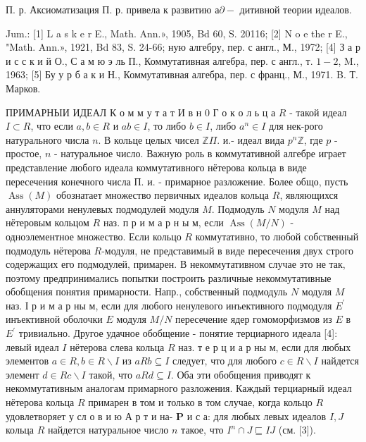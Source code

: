 \documentclass[10pt]{article}
\begin{document}
П. р. Аксиоматизация П. р. привела к развитию $а \partial-$ дитивной теории идеалов.



Jum.: [1] L a s k e r E., Math. Ann.», 1905, Bd 60, S. 20116; [2] N o e the r E., "Math. Ann.», 1921, Bd 83, S. 24-66; ную алгебру, пер. с англ., М., 1972; [4] З а р и с с к и й О., С а м ю э ль П., Коммутативная алгебра, пер. с англ., т. $1-2$, M., 1963; [5] Бу у р б а к и Н., Коммутативная алгебра, пер. с франц., М., 1971. B. Т. Марков.



ПРИМАРНЫИ ИДЕАЛ К о м м у т а т И в н 0 Г $о$ к о л ь ц а $R$ - такой идеал $I \subset R$, что если $a, b \in R$ и $a b \in I$, то либо $b \in I$, либо $a^{n} \in I$ для нек-рого натурального числа $n$. В кольце целых чисел $\mathbb{Z} \Pi$. и.- идеал вида $p^{n} \mathbb{Z}$, где $p$ - простое, $n$ - натуральное число. Важную роль в коммутативной алгебре играет представление любого идеала коммутативного нётерова кольца в виде пересечения конечного числа П. и. - примарное разложение. Более общо, пусть $\operatorname{Ass}(M)$ обознатает множество первичных идеалов кольца $R$, являющихся аннуляторами ненулевых подмодулей модуля $M$. Подмодуль $N$ модуля $M$ над нётеровым кольцом $R$ наз. п р и м а р н ы м, если $\operatorname{Ass}(M / N)$ - одноэлементное множество. Если кольцо $R$ коммутативно, то любой собственный подмодуль нётерова $R$-модуля, не представимый в виде пересечения двух строго содержащих его подмодулей, примарен. В некоммутативном случае это не так, поэтому предпринимались попытки построить различные некоммутативные обобщения понятия примарности. Напр., собственный подмодуль $N$ модуля $M$ наз. І р и м а р ны м, если для любого ненулевого инъективного подмодуля $E^{\prime}$ инъективной оболочки $E$ модуля $M / N$ пересечение ядер гомоморфизмов из $E$ в $E^{\prime}$ тривиально. Другое удачное обобщение - понятие терциарного идеала [4]: левый идеал $I$ нётерова слева кольца $R$ наз. т е р ц и а р ны м, если для любых элементов $a \in R, b \in R \backslash I$ из $a R b \subseteq I$ следует, что для любого $c \in R \backslash I$ найдется элемент $d \in R c \backslash I$ такой, что $a R d \subseteq I$. Оба эти обобщения приводят к некоммутативным аналогам примарного разложения. Каждый терциарный идеал нётерова кольца $R$ примарен в том и только в том случае, когда кольцо $R$ удовлетворяет у сл о в и ю А р т и на- $\mathbf{P}$ и с а: для любых левых идеалов $I, J$ кольца $R$ найдется натуральное число $n$ такое, что $I^{n} \cap J \sqsubseteq I J$ (см. [3]).
\end{document}
